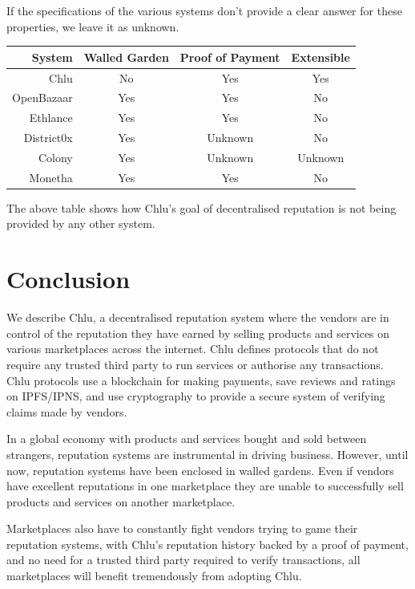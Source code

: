 \documentclass[a4paper]{article}
\begin{document}
If the specifications of the various systems don't provide a clear
answer for these properties, we leave it as unknown.

\begin{center}
\begin{tabular}{ | r | c | c | c | }
  \hline
  System & Walled Garden & Proof of Payment & Extensible \\
  \hline

  Chlu & No & Yes & Yes \\

  \hline

  OpenBazaar\cite{openbazaar} & Yes & Yes & No \\

  \hline

  Ethlance\cite{ethlance} & Yes & Yes & No \\

  \hline

  District0x\cite{district0x} & Yes & Unknown & No \\

  \hline

  Colony\cite{colony} & Yes & Unknown & Unknown \\

  \hline

  Monetha\cite{monetha} & Yes & Yes & No \\

  \hline
\end{tabular}
\end{center}

The above table shows how Chlu's goal of decentralised reputation is
not being provided by any other system.

\section{Conclusion}

We describe Chlu, a decentralised reputation system where the vendors
are in control of the reputation they have earned by selling products
and services on various marketplaces across the internet. Chlu defines
protocols that do not require any trusted third party to run services
or authorise any transactions. Chlu protocols use a blockchain for
making payments, save reviews and ratings on IPFS/IPNS, and use
cryptography to provide a secure system of verifying claims made by
vendors.

In a global economy with products and services bought and sold between
strangers, reputation systems are instrumental in driving
business. However, until now, reputation systems have been enclosed in
walled gardens. Even if vendors have excellent reputations in one
marketplace they are unable to successfully sell products and services
on another marketplace.

Marketplaces also have to constantly fight vendors trying to game
their reputation systems, with Chlu's reputation history backed by a
proof of payment, and no need for a trusted third party required to
verify transactions, all marketplaces will benefit tremendously from
adopting Chlu.

{}

\end{document}
